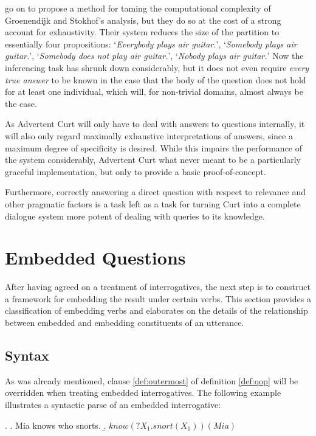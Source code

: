 \documentclass[notitlepage,twoside,a4paper]{scrreprt}
\newcommand{\pn}{\textsf} %
\newcommand{\example}[1]{`\textit{#1}'} %
\newcommand{\curt}{\pn{Curt}}
\newcommand{\acurt}{\pn{Advertent Curt}}
\theoremstyle{remark}
\theoremstyle{remark}
\theoremstyle{definition}
\theoremstyle{definition}
\begin{document}
\cite{bosgabdsil} go on to propose a method for taming the computational
complexity of Groenendijk and Stokhof's analysis, but they do so at the cost of
a strong account for exhaustivity. Their system reduces the size of the
partition to essentially four propositions: \example{Everybody plays air
guitar.}, \example{Somebody plays air guitar.}, \example{Somebody does not play
air guitar.}, \example{Nobody plays air guitar.} Now the inferencing task has
shrunk down considerably, but it does not even require \emph{every true answer}
to be known in the case that the body of the question does not hold for at least
one individual, which will, for non-trivial domains, almost always be the case.

As \acurt{} will only have to deal with answers to questions
internally, it will also only regard maximally exhaustive interpretations of
answers, since a maximum degree of specificity is desired. While this impairs
the performance of  the system considerably, \acurt{} what never meant to be a
particularly graceful implementation, but only to provide a basic proof-of-concept.

Furthermore, correctly answering a direct question with respect to relevance and other
pragmatic factors is a task left as a task for turning \curt{} into a complete
dialogue system more potent of dealing with queries to its knowledge.

\section{Embedded Questions}\label{sec:embed}

After having agreed on a treatment of interrogatives, the next step is to
construct a framework for embedding the result under certain verbs.  This
section provides a classification of embedding verbs and elaborates on the
details of the relationship between embedded and embedding constituents of an
utterance.

\subsection{Syntax}
As was already mentioned, clause \ref{def:outermost} of definition \ref{def:qop}
will be overridden when treating embedded interrogatives. The following example
illustrates a syntactic parse of an embedded interrogative:

\ex. \label{ex:whembed}
\a. Mia knows who snorts.\footnotesize
\b. $know(?X_1.snort(X_1))(Mia)$\label{ex:formula}
\end{document}
